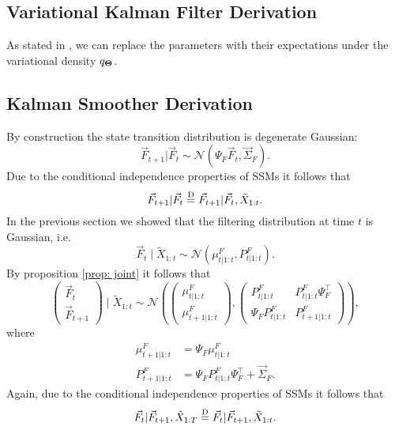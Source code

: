 \subsection{Variational Kalman Filter Derivation}
As stated in \cite{bealVariationalAlgorithmsApproximate}, we can replace the parameters with their expectations under the variational density $q_{ \bf \Theta }$.

\clearpage
\subsection{Kalman Smoother Derivation}

By construction the state transition distribution is degenerate Gaussian:  
\begin{equation*}
	\vec{F}_{t+1} \vert \vec{F}_{t} \sim \mathcal{N} \left( \Psi_{F} \vec{F}_{t}, \vec{\Sigma}_F \right).
\end{equation*}
Due to the conditional independence properties of SSMs it follows that 
$$\vec{F}_{t+1} \vert \vec{F}_{t} \overset{\text D}{=} \vec{F}_{t+1} \vert \vec{F}_{t} , \tilde{X}_{1:t}.$$
In the previous section we showed that the filtering distribution at time $t$ is Gaussian, i.e. 
$$\vec{F}_{t} \; \vert \; \tilde{X}_{1:t} \sim \mathcal N \left( \mu_{t | 1:t}^F, P_{t | 1:t}^F \right).$$ 
By proposition \ref{prop: joint} it follows that 
\begin{equation}
	\begin{pmatrix} \vec{F}_{t} \\ \vec{F}_{t+1} \end{pmatrix} 
	\; \vert \; \tilde{X}_{1:t} \sim 
	\mathcal N \left( \begin{pmatrix} \mu_{t | 1:t}^F \\ \mu_{t+1 | 1:t}^F \end{pmatrix},
	\begin{pmatrix} 
		P_{t | 1:t}^F & P_{t | 1:t}^F \Psi_{F}^{\top} \\ 
		\Psi_{F} P_{t | 1:t}^F & P_{t+1 | 1:t}^F
	\end{pmatrix} \right),
\end{equation}
where 
\begin{align*}
	\mu_{t+1 | 1:t}^F &= \Psi_{F} \mu_{t | 1:t}^F \\
	P_{t+1 | 1:t}^F &= \Psi_{F} P_{t | 1:t}^F \Psi_{F}^{\top} + \vec{\Sigma}_F.	
\end{align*}
Again, due to the conditional independence properties of SSMs it follows that 
$$\vec{F}_{t} \vert \vec{F}_{t+1}, \tilde{X}_{1:T} \overset{\text D}{=} \vec{F}_{t} \vert \vec{F}_{t+1} , \tilde{X}_{1:t}.$$
